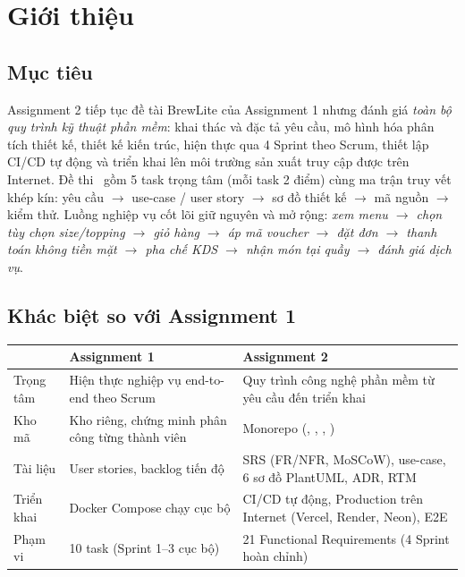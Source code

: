\documentclass[12pt, a4paper]{article}
\begin{document}

\section{Giới thiệu}
\subsection{Mục tiêu}
Assignment 2 tiếp tục đề tài BrewLite của Assignment 1 nhưng đánh giá \emph{toàn bộ quy trình kỹ thuật phần mềm}:
khai thác và đặc tả yêu cầu, mô hình hóa phân tích thiết kế, thiết kế kiến trúc, hiện thực qua 4 Sprint theo Scrum,
thiết lập CI/CD tự động và triển khai lên môi trường sản xuất truy cập được trên Internet.
Đề thi~\cite{de} gồm 5 task trọng tâm (mỗi task 2 điểm) cùng ma trận truy vết khép kín:
yêu cầu $\rightarrow$ use-case / user story $\rightarrow$ sơ đồ thiết kế $\rightarrow$ mã nguồn $\rightarrow$ kiểm thử.
Luồng nghiệp vụ cốt lõi giữ nguyên và mở rộng:
\emph{xem menu $\rightarrow$ chọn tùy chọn size/topping $\rightarrow$ giỏ hàng $\rightarrow$ áp mã voucher $\rightarrow$ đặt đơn $\rightarrow$ thanh toán không tiền mặt $\rightarrow$ pha chế KDS $\rightarrow$ nhận món tại quầy $\rightarrow$ đánh giá dịch vụ}.

\subsection{Khác biệt so với Assignment 1}
\begin{table}[!htbp]\centering\small
\begin{tabularx}{\textwidth}{@{}L{3cm} X X@{}}
\toprule & \textbf{Assignment 1} & \textbf{Assignment 2} \\ \midrule
Trọng tâm & Hiện thực nghiệp vụ end-to-end theo Scrum & Quy trình công nghệ phần mềm từ yêu cầu đến triển khai \\
Kho mã & Kho riêng, chứng minh phân công từng thành viên & Monorepo (, , , ) \\
Tài liệu & User stories, backlog tiến độ & SRS (FR/NFR, MoSCoW), use-case, 6 sơ đồ PlantUML, ADR, RTM \\
Triển khai & Docker Compose chạy cục bộ & CI/CD tự động, Production trên Internet (Vercel, Render, Neon), E2E \\
Phạm vi & 10 task (Sprint 1--3 cục bộ) & 21 Functional Requirements (4 Sprint hoàn chỉnh) \\ \bottomrule
\end{tabularx}
\end{table}
\end{document}
